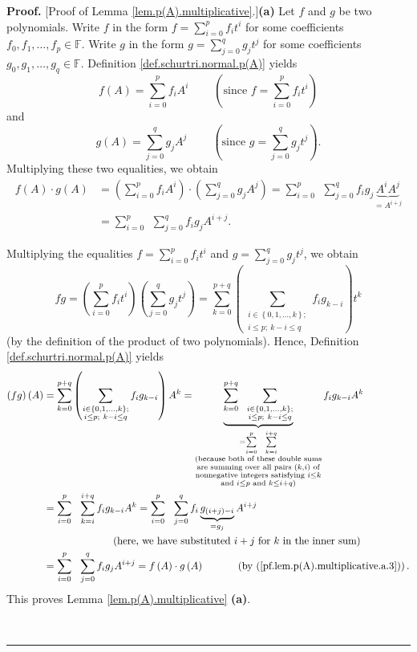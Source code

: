 \documentclass[numbers=enddot,12pt,final,onecolumn,notitlepage]{scrartcl}%
\numberwithin{exer}{subsection}
\theoremstyle{definition}
\newenvironment{proof}[1][Proof]{\noindent\textbf{#1.} }{\ \rule{0.5em}{0.5em}}
\let\sumnonlimits\sum
\renewcommand{\sum}{\sumnonlimits\limits}
\begin{document}
\begin{proof}
[Proof of Lemma \ref{lem.p(A).multiplicative}.]\textbf{(a)} Let $f$ and $g$ be
two polynomials. Write $f$ in the form $f=\sum_{i=0}^{p}f_{i}t^{i}$ for some
coefficients $f_{0},f_{1},\ldots,f_{p}\in\mathbb{F}$. Write $g$ in the form
$g=\sum_{j=0}^{q}g_{j}t^{j}$ for some coefficients $g_{0},g_{1},\ldots
,g_{q}\in\mathbb{F}$. Definition \ref{def.schurtri.normal.p(A)} yields%
\[
f\left(  A\right)  =\sum_{i=0}^{p}f_{i}A^{i}\ \ \ \ \ \ \ \ \ \ \left(
\text{since }f=\sum_{i=0}^{p}f_{i}t^{i}\right)
\]
and%
\[
g\left(  A\right)  =\sum_{j=0}^{q}g_{j}A^{j}\ \ \ \ \ \ \ \ \ \ \left(
\text{since }g=\sum_{j=0}^{q}g_{j}t^{j}\right)  .
\]
Multiplying these two equalities, we obtain%
\begin{align}
f\left(  A\right)  \cdot g\left(  A\right)   &  =\left(  \sum_{i=0}^{p}%
f_{i}A^{i}\right)  \cdot\left(  \sum_{j=0}^{q}g_{j}A^{j}\right)  =\sum
_{i=0}^{p}\ \ \sum_{j=0}^{q}f_{i}g_{j}\underbrace{A^{i}A^{j}}_{=A^{i+j}%
}\nonumber\\
&  =\sum_{i=0}^{p}\ \ \sum_{j=0}^{q}f_{i}g_{j}A^{i+j}.
\label{pf.lem.p(A).multiplicative.a.3}%
\end{align}


Multiplying the equalities $f=\sum_{i=0}^{p}f_{i}t^{i}$ and $g=\sum_{j=0}%
^{q}g_{j}t^{j}$, we obtain%
\[
fg=\left(  \sum_{i=0}^{p}f_{i}t^{i}\right)  \left(  \sum_{j=0}^{q}g_{j}%
t^{j}\right)  =\sum_{k=0}^{p+q}\left(  \sum_{\substack{i\in\left\{
0,1,\ldots,k\right\}  ;\\i\leq p;\ k-i\leq q}}f_{i}g_{k-i}\right)  t^{k}%
\]
(by the definition of the product of two polynomials). Hence, Definition
\ref{def.schurtri.normal.p(A)} yields%
\begin{align*}
\left(  fg\right)  \left(  A\right)   &  =\sum_{k=0}^{p+q}\left(
\sum_{\substack{i\in\left\{  0,1,\ldots,k\right\}  ;\\i\leq p;\ k-i\leq
q}}f_{i}g_{k-i}\right)  A^{k}=\underbrace{\sum_{k=0}^{p+q}\ \ \sum
_{\substack{i\in\left\{  0,1,\ldots,k\right\}  ;\\i\leq p;\ k-i\leq q}%
}}_{\substack{=\sum_{i=0}^{p}\ \ \sum_{k=i}^{i+q}\\\text{(because both of
these double sums}\\\text{are summing over all pairs }\left(  k,i\right)
\text{ of}\\\text{nonnegative integers satisfying }i\leq k\\\text{and }i\leq
p\text{ and }k\leq i+q\text{)}}}f_{i}g_{k-i}A^{k}\\
&  =\sum_{i=0}^{p}\ \ \sum_{k=i}^{i+q}f_{i}g_{k-i}A^{k}=\sum_{i=0}^{p}%
\ \ \sum_{j=0}^{q}f_{i}\underbrace{g_{\left(  i+j\right)  -i}}_{=g_{j}}%
A^{i+j}\\
&  \ \ \ \ \ \ \ \ \ \ \ \ \ \ \ \ \ \ \ \ \left(  \text{here, we have
substituted }i+j\text{ for }k\text{ in the inner sum}\right) \\
&  =\sum_{i=0}^{p}\ \ \sum_{j=0}^{q}f_{i}g_{j}A^{i+j}=f\left(  A\right)  \cdot
g\left(  A\right)  \ \ \ \ \ \ \ \ \ \ \left(  \text{by
(\ref{pf.lem.p(A).multiplicative.a.3})}\right)  .
\end{align*}
This proves Lemma \ref{lem.p(A).multiplicative} \textbf{(a)}. \medskip


\end{proof}
\end{document}

